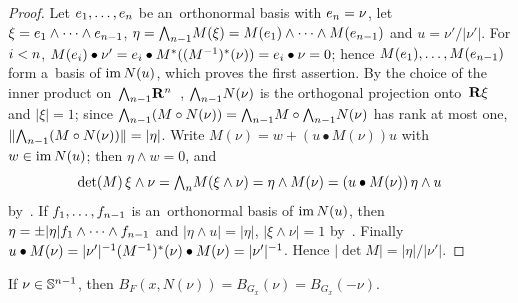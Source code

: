 \documentclass[a4paper,twoside,leqno]{article}
\begin{document}
\begin{proof}
    Let $e_1, \ldots, e_{n}$ be an~orthonormal basis with $e_{n} = \nu$, let $\xi = e_1
    \wedge \cdots \wedge e_{n-1}$, $\eta = {\textstyle\boldsymbol{\bigwedge}}_{{n-1}} M(\xi) = M(e_1) \wedge \cdots
    \wedge M(e_{n-1})$ and $u = \nu'/|\nu'|$. For $i < n$, $M(e_i) \bullet \nu' = e_i
    \bullet M^{*}((M^{-1})^{*}(\nu)) = e_i \bullet \nu = 0$; hence $M(e_1),
    \ldots, M(e_{n-1})$ form a~basis of $\operatorname{im} N(u)$, which proves the first assertion. By the
    choice of the inner product on~${\textstyle\boldsymbol{\bigwedge}}_{{n-1}}\mathbf{R}^{n}$~\cite[1.7.5]{Federer1969},
    ${\textstyle\boldsymbol{\bigwedge}}_{{n-1}} N(\nu)$ is the orthogonal projection onto~$\mathbf{R} \xi$ and $|\xi| = 1$; since
    ${\textstyle\boldsymbol{\bigwedge}}_{{n-1}}(M \circ N(\nu)) = {\textstyle\boldsymbol{\bigwedge}}_{{n-1}} M \circ {\textstyle\boldsymbol{\bigwedge}}_{{n-1}} N(\nu)$ has
    rank at most one, $\|{\textstyle\boldsymbol{\bigwedge}}_{{n-1}}(M \circ N(\nu))\| = |\eta|$. Write $M(\nu) = w + (u
    \bullet M(\nu)) u$ with $w \in \operatorname{im} N(u)$; then $\eta \wedge w = 0$, and
    \begin{displaymath}
        \det(M) \, \xi \wedge \nu = {\textstyle\boldsymbol{\bigwedge}}_{{n}} M(\xi \wedge \nu) = \eta \wedge M(\nu) = (u
        \bullet M(\nu)) \, \eta \wedge u
    \end{displaymath}
    by~\cite[1.3.4]{Federer1969}. If $f_1, \ldots, f_{n-1}$ is an~orthonormal basis of
    $\operatorname{im} N(u)$, then $\eta = \pm |\eta| f_1 \wedge \cdots \wedge f_{n-1}$ and $|\eta \wedge u| =
    |\eta|$, $|\xi \wedge \nu| = 1$ by~\cite[1.7.5]{Federer1969}. Finally $u \bullet M(\nu) =
    |\nu'|^{-1} (M^{-1})^{*}(\nu) \bullet M(\nu) = |\nu'|^{-1}$. Hence $|\det M| = |\eta| /
    |\nu'|$.
\end{proof}

\begin{lemma}
    \label{new:BG}
    If $\nu \in \mathbb{S}^{n-1}$, then $B_F(x,N(\nu)) = B_{G_x}(\nu) = B_{G_x}(-\nu)$.
\end{lemma}
\end{document}

